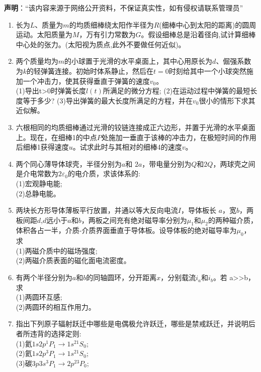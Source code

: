 

\textbf{声明}：“该内容来源于网络公开资料，不保证真实性，如有侵权请联系管理员”

\begin{enumerate}
\item 长为$L$、质量为$m$的均质细棒绕太阳作半径为$R$(细棒中心到太阳的距离)的圆周运动。太阳质量为$M$，万有引力常数为$G$。假设细棒总是沿着径向,试计算细棒中心处的张力。(太阳视为质点,此外不要做任何近似)。
\item 两个质量均为$m$的小球置于光滑的水平桌面上，其中心用原长为$d$、倔强系数为$k$的轻弹簧连接。初始时体系静止，然后在$t=0$时刻给其中一个小球突然施加一个冲击力，使其获得垂直于弹簧的速度$v_0$。\\
(1)导出t>0时弹簧长度$l(t)$所满足的微分方程;
(2)在运动过程中弹簧的最短长度等于多少?
(3)导出弹簧的最大长度所满足的方程，并在$v_0$很小的情形下求其近似解。
\item 六根相同的均质细棒通过光滑的铰链连接成正六边形，并置于光滑的水平桌面上。现在，在细棒1的中点$P$处施加一垂直于该棒的冲击力，在极短时间的作用后细棒1获得速度$u$。试求此时与其相对的细棒4的速度$v$。
\item 两个同心薄导体球壳，半径分别为$a$和 $2a$，带电量分别为$Q$和$2Q$，两球壳之间是介电常数为$2\varepsilon_0$的电介质，求该体系的:\\
(1)宏观静电能;\\
(2)总静电能。
\item 两块长方形导体薄板平行放置，并通以等大反向电流$I$，导体板长 $a$，宽$b$，两板间距$d$,$d$远小于$a$和$b$，两板之间充有绝对磁导率分别为$\mu_1$和$\mu_2$的两种磁介质，体积各占一半，介质-介质界面垂直于导体板。设导体板的绝对磁导率为$\mu_0$，求\\
(1)两磁介质中的磁场强度;\\
(2)两磁介质表面的磁化面电流密度。\\
\item 有两个半径分别为$a$和$b$的同轴圆环，分开距离$x$，分别载流$i_a$和$i_b$。若 a>>b，求\\
(1)两圆环互感;\\
(2)两圆环的相互作用力。
\item 指出下列原子辐射跃迁中哪些是电偶极允许跃迁，哪些是禁戒跃迁，并说明后者所违背的选择定则:\\
(1)氦$1s2p^1P_1 \to 1s^{21}S_0$;\\
(2)氦$1s2p^3P_1 \to 1s^{21}S_0$;\\
(3)碳$3p3s^3P_1\to 2p^{23}P_0$;\\

\end{enumerate}

